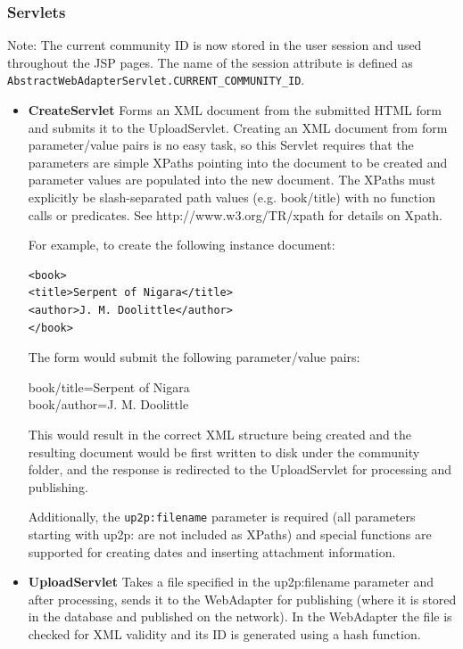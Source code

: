 \documentclass[titlepage]{article}%
\begin{document}
\subsubsection{Servlets}
Note: The current community ID is now stored in the user session and used throughout the JSP pages. The name of the session attribute is defined as \verb;AbstractWebAdapterServlet.CURRENT_COMMUNITY_ID;.

\begin{itemize}
\item \textbf{CreateServlet} Forms an XML document from the submitted HTML form and submits it to the UploadServlet. Creating an XML document from form parameter/value pairs is no easy task, so this Servlet requires that the parameters are simple XPaths pointing into the document to be created and parameter values are populated into the new document.
The XPaths must explicitly be slash-separated path values (e.g. book/title) with no function calls or predicates. See http://www.w3.org/TR/xpath for details on Xpath. 

For example, to create the following instance document:
\begin{verbatim}
<book>
<title>Serpent of Nigara</title>
<author>J. M. Doolittle</author>
</book>
\end{verbatim}

The form would submit the following parameter/value pairs:

book/title=Serpent of Nigara\\
book/author=J. M. Doolittle

This would result in the correct XML structure being created and the resulting document would be first written to disk under the community folder, and the response is redirected to the UploadServlet for processing and publishing.

Additionally, the \verb.up2p:filename. parameter is required (all parameters starting with up2p: are not included as XPaths) and special functions are supported for creating dates and inserting attachment information. 


\item \textbf{UploadServlet} Takes a file specified in the up2p:filename parameter and after processing, sends it to the WebAdapter for publishing (where it is stored in the database and published on the network). In the WebAdapter the file is checked for XML validity and its ID is generated using a hash function.


\end{itemize}
\end{document}

